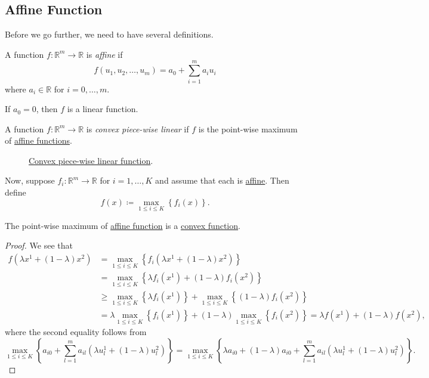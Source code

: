 \subsection{Affine Function}
Before we go further, we need to have several definitions.
\begin{definition}\label{def:affine-function}
	A function \(f\colon \mathbb{R}^{m}\to \mathbb{R}\) is \emph{affine} if
	\[
		f(u_1, u_2, \dots , u_m) = a_0 + \sum\limits_{i=1}^{m} a_{i}u_{i}
	\]
	where \(a_i \in\mathbb{R}\) for \(i = 0, \dots , m\).
\end{definition}

\begin{remark}
	If \(a_0 = 0\), then \(f\) is a linear function.
\end{remark}

\begin{definition}\label{def:convex-piece-wise-linear-function}
	A function \(f\colon \mathbb{R}^{m}\to \mathbb{R}\) is \emph{convex piece-wise linear} if \(f\) is the point-wise maximum of \hyperref[def:affine-function]{affine functions}.
\end{definition}

\begin{figure}[H]
	\centering
	\caption{\hyperref[def:convex-piece-wise-linear-function]{Convex piece-wise linear function}.}
	\label{fig:convex-piecewise-linear-function}
\end{figure}
Now, suppose \(f_{i}\colon \mathbb{R}^m \to \mathbb{R}\) for \(i = 1, \dots , K\) and assume that each is \hyperref[def:affine-function]{affine}.
Then define
\[
	f(x)\coloneqq \max_{1\leq i\leq K} \left\{ f_i(x) \right\}.
\]

\begin{theorem}
	The point-wise maximum of \hyperref[def:affine-function]{affine function} is a \hyperref[def:convex-function]{convex function}.
\end{theorem}
\begin{proof}
	We see that
	\[
		\begin{split}
			f(\lambda x^1 + (1 - \lambda)x^2) &=\max_{1\leq i\leq K}\left\{ f_i(\lambda x^1 + (1 - \lambda)x^2) \right\}\\
			&=\max_{1\leq i\leq K}\left\{ \lambda f_{i}(x^1) + (1 - \lambda)f_{i}(x^2) \right\}\\
			&\geq \max_{1\leq i\leq K}\left\{ \lambda f_{i}(x^1)\right\} + \max_{1\leq i\leq K}\left\{(1 - \lambda)f_{i}(x^2) \right\}\\
			&=\lambda\max_{1\leq i\leq K}\left\{f_{i}(x^1)\right\} + (1 - \lambda)\max_{1\leq i\leq K}\left\{f_{i}(x^2) \right\}
			= \lambda f(x^1)+(1 - \lambda)f(x^2),
		\end{split}
	\]
	where the second equality follows from
	\[
		\max_{1\leq i\leq K}\left\{ a_{i0}+\sum\limits_{l=1}^{m} a_{il}(\lambda u^1_l + (1 - \lambda)u^2_l) \right\}
		= \max_{1\leq i\leq K}\left\{ \lambda a_{i0}+(1 - \lambda)a_{i0} + \sum\limits_{l=1}^{m} a_{il}(\lambda u^1_l + (1 - \lambda)u^2_l) \right\}.
	\]
\end{proof}